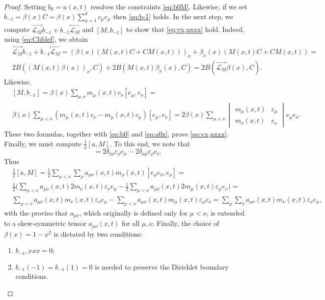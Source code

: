 \documentclass[10pt,a4paper]{amsart}
\newcommand{\InMb}{\stackrel{\leftarrow}{\mathcal{L}_{M}}}
\newcommand{\InMf}{\stackrel{\rightarrow}{\mathcal{L}_{M}}}
\renewcommand{\epsilon}{\varepsilon}
\begin{document}
\begin{proof}
Setting $b_0=u(x,t)$ resolves the constraints \eqref{eq:b0M}.  Likewise, if we set $b_{-1}=\beta(x) C=\beta(x)\sum_{\mu=1}^d c_\mu e_\mu$ then \eqref{eq:b-1} holds.  
In the next step, we compute $\InMf b_{-1}+b_{-1}\InMb$ and $[M,b_{-1}]$ to show that \autoref{eq:vx,uxxx} hold.  Indeed, using \eqref{eq:Clifdef}, we obtain
\begin{equation} 
\begin{split} 
&\InMf b_{-1}+b_{-1}\InMb=(\beta(x)(M(x,t)C+CM(x,t)))_x+\beta_{x}(x)(M(x, t)C+CM(x,t))=\\
 &2B((M(x,t)\beta(x))_x,C)+2B(M(x,t)\beta_x(x),C)=2B(\InMf \beta(x),C).  
 \end{split}
\end{equation} 
Likewise, 
\begin{equation} 
\begin{split}
&[M,b_{-1}]=\beta(x)\sum_{\mu,\nu}m_\mu(x,t)c_\nu[e_\mu,e_\nu]=\\
&\beta(x)\sum_{\mu<\nu}(m_\mu(x,t)c_\nu-m_\mu(x,t) c_\mu)[e_\mu,e_\nu]=2\beta(x)\sum_{\mu<\nu} \begin{vmatrix} m_\mu(x,t)&c_\mu\\m_\nu(x,t)&c_\nu \end{vmatrix} e_\mu e_\nu. 
\end{split} 
\end{equation}
These two formulas, together with \eqref{eq:b0} and \eqref{eq:a0x},  prove \eqref{eq:vx,uxxx}.  Finally, we must compute $\frac12 [a,M]$.  
To this end, we note that 
\begin{equation} 
[e_\mu e_\nu, e_\rho]=2\delta_{\nu \rho} \epsilon_\rho e_\mu-2\delta_{\mu \rho}\epsilon_\rho  e_\nu.  
\end{equation} 
Thus 
\begin{equation} 
\begin{split}
&\frac12[a,M]=\frac12 \sum_{\mu<\nu} \sum_{\rho} a_{\mu \nu}(x,t)m_\rho(x,t)[e_\mu e_\nu, e_\rho]=\\
&\frac12 \big( \sum_{\mu<\nu} a_{\mu \nu}(x,t) 2m_\nu(x,t) \epsilon_\nu e_\mu-\frac12 \sum_{\mu<\nu}a_{\mu \nu}(x,t) 2m_\mu (x,t) \epsilon _\mu  e_\nu \big)=\\
&\sum_{\mu< \nu} a_{\mu \nu }(x,t) m_\nu(x,t)  \epsilon_\nu e_\mu- \sum_{\mu<\nu}a_{\mu \nu }(x,t) m_\mu (x,t) \epsilon_\mu  e_\nu=
\sum_\mu \sum_\nu  a_{\mu \nu}(x,t) m_\nu (x,t) \epsilon_\nu  e_\mu, 
\end{split}
\end{equation} 
with the proviso that $a_{\mu \nu}$, which originally is defined only for $\mu<\nu$,  is extended to a skew-symmetric tensor $a_{\mu \nu}(x,t)$ for all $\mu, \nu$.  Finally, the choice of $\beta(x)=1-x^2$ is dictated by two conditions: 
\begin{enumerate} 
\item $b_{-1},xxx=0$; 
\item $b_{-1}(-1)=b_{-1}(1)=0$  is needed to preserve the Dirichlet boundary conditions.  
\end{enumerate} 
\end{proof} 
\end{document}
